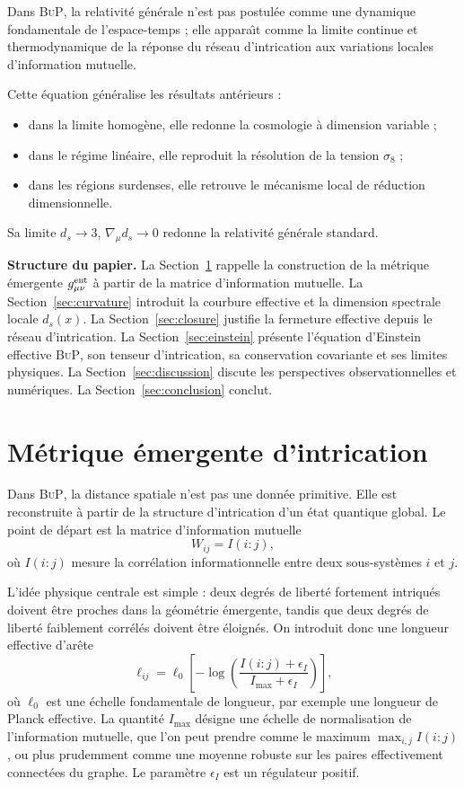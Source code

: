 \documentclass[11pt]{article}
\newcommand{\sig}{\sigma_8}
\newcommand{\BuP}{\textsc{BuP}}
\newcommand{\ent}{\rm ent}
\begin{document}
Dans \BuP, la relativit\'e g\'en\'erale n'est pas postul\'ee comme une dynamique
fondamentale de l'espace-temps ; elle appara\^{\i}t comme la limite continue et
thermodynamique de la r\'eponse du r\'eseau d'intrication aux variations locales
d'information mutuelle.

Cette \'equation g\'en\'eralise les r\'esultats ant\'erieurs :
\begin{itemize}
  \item dans la limite homog\`ene, elle redonne la cosmologie \`a dimension variable ;
  \item dans le r\'egime lin\'eaire, elle reproduit la r\'esolution de la tension $\sig$ ;
  \item dans les r\'egions surdenses, elle retrouve le m\'ecanisme local de r\'eduction
        dimensionnelle.
\end{itemize}
Sa limite $d_s\to 3$, $\nabla_\mu d_s\to 0$ redonne la relativit\'e g\'en\'erale standard.

\textbf{Structure du papier.}
La Section~\ref{sec:metric} rappelle la construction de la m\'etrique \'emergente
$g_{\mu\nu}^{\ent}$ \`a partir de la matrice d'information mutuelle.
La Section~\ref{sec:curvature} introduit la courbure effective et la dimension
spectrale locale $d_s(x)$.
La Section~\ref{sec:closure} justifie la fermeture effective depuis le r\'eseau
d'intrication.
La Section~\ref{sec:einstein} pr\'esente l'\'equation d'Einstein effective \BuP,
son tenseur d'intrication, sa conservation covariante et ses limites physiques.
La Section~\ref{sec:discussion} discute les perspectives observationnelles et
num\'eriques.
La Section~\ref{sec:conclusion} conclut.

\section{M\'etrique \'emergente d'intrication}
\label{sec:metric}

Dans \BuP, la distance spatiale n'est pas une donn\'ee primitive. Elle est
reconstruite \`a partir de la structure d'intrication d'un \'etat quantique global.
Le point de d\'epart est la matrice d'information mutuelle
\[
W_{ij}=I(i:j),
\]
o\`u $I(i:j)$ mesure la corr\'elation informationnelle entre deux sous-syst\`emes
$i$ et $j$.

L'id\'ee physique centrale est simple : deux degr\'es de libert\'e fortement intriqu\'es
doivent \^etre proches dans la g\'eom\'etrie \'emergente, tandis que deux degr\'es de
libert\'e faiblement corr\'el\'es doivent \^etre \'eloign\'es. On introduit donc une
longueur effective d'ar\^ete
\[
\ell_{ij}
=
\ell_0
\left[
-\log\!\left(
\frac{I(i:j)+\epsilon_I}{I_{\max}+\epsilon_I}
\right)
\right],
\]
o\`u $\ell_0$ est une \'echelle fondamentale de longueur, par exemple une longueur
de Planck effective. La quantit\'e $I_{\max}$ d\'esigne une \'echelle de normalisation
de l'information mutuelle, que l'on peut prendre comme le maximum
$\max_{i,j}I(i:j)$, ou plus prudemment comme une moyenne robuste sur les paires
effectivement connect\'ees du graphe. Le param\`etre $\epsilon_I$ est un r\'egulateur
positif.
\end{document}
